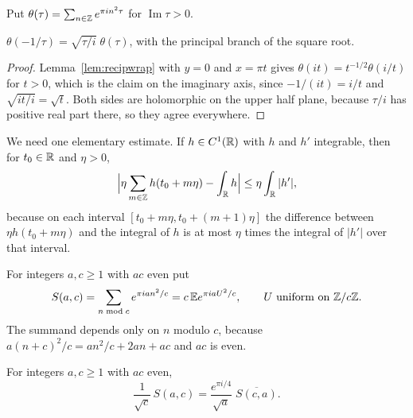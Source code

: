 Put $\theta(\tau)=\sum_{n\in\mathbb{Z}}e^{\pi in^2\tau}$ for $\operatorname{Im}\tau>0$.

\begin{theorem}\label{thm:reciptheta}
$\theta(-1/\tau)=\sqrt{\tau/i}\;\theta(\tau)$, with the principal branch of the square root.
\end{theorem}

\begin{proof}
Lemma~\ref{lem:recipwrap} with $y=0$ and $x=\pi t$ gives $\theta(it)=t^{-1/2}\theta(i/t)$ for $t>0$, which is the claim on the imaginary axis, since $-1/(it)=i/t$ and $\sqrt{it/i}=\sqrt t$. Both sides are holomorphic on the upper half plane, because $\tau/i$ has positive real part there, so they agree everywhere.
\end{proof}

We need one elementary estimate. If $h\in C^1(\mathbb{R})$ with $h$ and $h'$ integrable, then for $t_0\in\mathbb{R}$ and $\eta>0$,
\begin{equation}\label{eq:recipriemann}
\Bigl|\eta\sum_{m\in\mathbb{Z}}h(t_0+m\eta)-\int_{\mathbb{R}}h\Bigr|\le\eta\int_{\mathbb{R}}|h'| ,
\end{equation}
because on each interval $[t_0+m\eta,t_0+(m+1)\eta]$ the difference between $\eta h(t_0+m\eta)$ and the integral of $h$ is at most $\eta$ times the integral of $|h'|$ over that interval.

For integers $a,c\ge1$ with $ac$ even put
\[
S(a,c)=\sum_{n\bmod c}e^{\pi ian^2/c}=c\,\mathbb{E} e^{\pi iaU^2/c},\qquad U\text{ uniform on }\mathbb{Z}/c\mathbb{Z} .
\]
The summand depends only on $n$ modulo $c$, because $a(n+c)^2/c=an^2/c+2an+ac$ and $ac$ is even.

\begin{theorem}\label{thm:recipls}
For integers $a,c\ge1$ with $ac$ even,
\[
\frac1{\sqrt c}\,S(a,c)=\frac{e^{\pi i/4}}{\sqrt a}\;\overline{S(c,a)} .
\]
\end{theorem}

